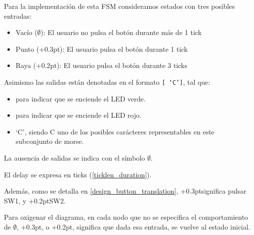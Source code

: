 \documentclass[a4paper,openright,12pt]{article}
\newcommand{\punto}{\kern+0.3pt\raisebox{0.35ex}{\huge\textbf.}}
\newcommand{\raya}{\kern+0.2pt\raisebox{-0.35ex}{\huge\textbf-}}
\begin{document}
Para la implementación de esta FSM consideramos estados con tres posibles entradas:
\begin{itemize}
    \item Vacío ($\emptyset$): El usuario no pulsa el botón durante más de 1 tick
    \item Punto (\punto): El usuario pulsa el botón durante 1 tick
    \item Raya (\raya): El usuario pulsa el botón durante 3 ticks
\end{itemize}

Asimismo las salidas están denotadas en el formato \texttt{[\text{\textcolor{green}{\punto}}\text{\textcolor{red}{\punto}} `C']}, tal que:
\begin{itemize}
    \item \text{\textcolor{green}{\punto}} para indicar que se enciende el LED verde.
    \item \text{\textcolor{red}{\punto}} para indicar que se enciende el LED rojo.
    \item `C', siendo C uno de los posibles carácteres representables en este subconjunto de morse.
\end{itemize}

La ausencia de salidas se indica con el símbolo $\emptyset$.
\bigskip

El delay se expresa en ticks (\ref{ticklen_duration}).
\bigskip

Además, como se detalla en \ref{design_button_translation}, \punto \space significa pulsar SW1, y \raya \space SW2.
\bigskip

Para oxigenar el diagrama, en cada nodo que no se especifica el comportamiento de $\emptyset$, \punto, o \raya, significa que dada esa entrada, se vuelve al estado inicial.

\clearpage
\end{document}
